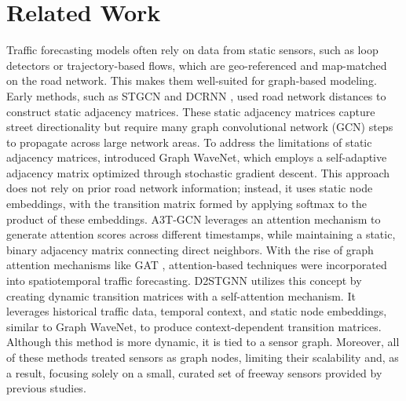 \section{Related Work}
\label{sec:related-work}
Traffic forecasting models often rely on data from static sensors, such as loop detectors or trajectory-based flows, which are geo-referenced and map-matched on the road network. This makes them well-suited for graph-based modeling. Early methods, such as STGCN \cite{yu18} and DCRNN \cite{li2018}, used road network distances to construct static adjacency matrices. 
These static adjacency matrices capture street directionality but require many graph convolutional network (GCN) \cite{kipf2017semisupervised} steps to propagate across large network areas.
To address the limitations of static adjacency matrices, \cite{Wu19} introduced Graph WaveNet, which employs a self-adaptive adjacency matrix optimized through stochastic gradient descent. 
This approach does not rely on prior road network information; instead, it uses static node embeddings, with the transition matrix formed by applying softmax to the product of these embeddings.
A3T-GCN \cite{Bai21} leverages an attention mechanism to generate attention scores across different timestamps, while maintaining a static, binary adjacency matrix connecting direct neighbors.
With the rise of graph attention mechanisms like GAT \cite{Velickovic18}, attention-based techniques were incorporated into spatiotemporal traffic forecasting. 
D2STGNN \cite{shao22} utilizes this concept by creating dynamic transition matrices with a self-attention mechanism. It leverages historical traffic data, temporal context, and static node embeddings, similar to Graph WaveNet, to produce context-dependent transition matrices. Although this method is more dynamic, it is tied to a sensor graph.
Moreover, all of these methods treated sensors as graph nodes, limiting their scalability and, as a result, focusing solely on a small, curated set of freeway sensors provided by previous studies.

